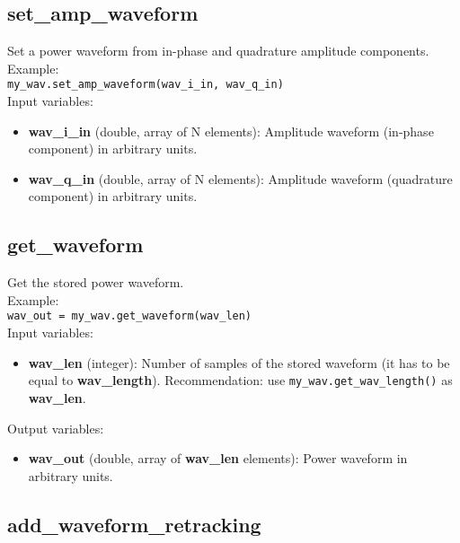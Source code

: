 \subsection{set\_amp\_waveform}

Set a power waveform from in-phase and quadrature amplitude components.\\

Example:\\

\texttt{my\_wav.set\_amp\_waveform(wav\_i\_in, wav\_q\_in)}\\

Input variables:
\begin{itemize}
\item {\bf wav\_i\_in} (double, array of N elements): Amplitude waveform (in-phase component) in arbitrary units.
\item {\bf wav\_q\_in} (double, array of N elements): Amplitude waveform (quadrature component) in arbitrary units.
\end{itemize}


\subsection{get\_waveform}

Get the stored power waveform.\\

Example:\\

\texttt{wav\_out = my\_wav.get\_waveform(wav\_len)}\\

Input variables:
\begin{itemize}
\item {\bf wav\_len} (integer): Number of samples of the stored waveform (it has to be equal to {\bf wav\_length}). Recommendation: use \texttt{my\_wav.get\_wav\_length()} as {\bf wav\_len}.
\end{itemize}

Output variables:
\begin{itemize}
\item {\bf wav\_out} (double, array of {\bf wav\_len} elements): Power waveform in arbitrary units.
\end{itemize}


\subsection{add\_waveform\_retracking}

